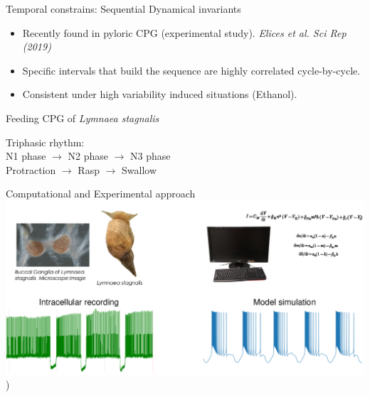 \documentclass[aspectratio=43]{beamer}
\begin{document}
\begin{frame}{Temporal constrains: Sequential Dynamical invariants}

		\begin{itemize}
			\item<1->Recently found in pyloric CPG (experimental study). \textit{Elices et al. \textit{Sci Rep} (2019)  }
			\item<1->Specific intervals that build the sequence are highly correlated cycle-by-cycle.
			\item<1->Consistent under high variability induced situations (Ethanol).
		\end{itemize}
	\vspace{5pt}
	\centering


\end{frame}

\begin{frame}{Feeding CPG of \textit{Lymnaea stagnalis}}

	Triphasic rhythm:
	\\
	\centering
	N1 phase $\rightarrow$ N2 phase $\rightarrow$ N3 phase \\
	Protraction $\rightarrow$ Rasp $\rightarrow$ Swallow\\
	\vspace{10pt}
	
	\centering

\end{frame}



\begin{frame}{Computational and Experimental approach}
	\includegraphics[width=\textwidth]{Images/experimental-computational.pdf})
\end{frame}
\end{document}
